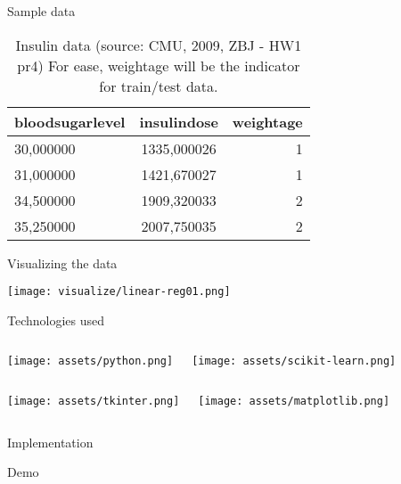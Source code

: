 \documentclass[10pt]{beamer}
\begin{document}
\begin{frame}{Sample data}
 \begin{table}
    \caption{Insulin data (source: CMU, 2009, ZBJ - HW1 pr4)\break
    For ease, weightage will be the indicator for train/test data.}
    \begin{tabular}{lcr}
      \toprule
      bloodsugarlevel & insulindose & weightage\\
      \midrule
      30,000000 & 1335,000026 & 1\\
      31,000000 & 1421,670027 & 1\\
      34,500000 & 1909,320033 & 2\\
      35,250000 & 2007,750035 & 2\\
      \bottomrule
    \end{tabular}
  \end{table}
\end{frame}
\begin{frame}{Visualizing the data}
  \begin{center}\texttt{[image: visualize/linear-reg01.png]}\end{center}
\end{frame}

\begin{frame}{Technologies used}
\begin{columns}[T,onlytextwidth]
      \texttt{[image: assets/python.png]}
      

     

     \texttt{[image: assets/scikit-learn.png]}
\end{columns}

\vspace{5mm} %

\begin{columns}[T,onlytextwidth]
      \texttt{[image: assets/tkinter.png]}

     \texttt{[image: assets/matplotlib.png]}
\end{columns}
\end{frame}

\begin{frame}{Implementation}
   \huge\begin{center}Demo\end{center}
\end{frame}
\end{document}

